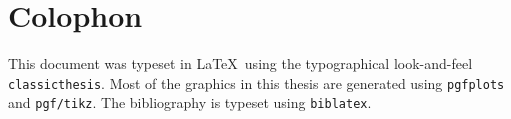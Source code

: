 \pagestyle{empty}

\hfill

\vfill


\section*{Colophon}
This document was typeset in \LaTeX~using the typographical look-and-feel
\texttt{classicthesis}. Most of the graphics in
this thesis are generated using \texttt{pgfplots} and \texttt{pgf/tikz}. The
bibliography is typeset using \texttt{biblatex}.
